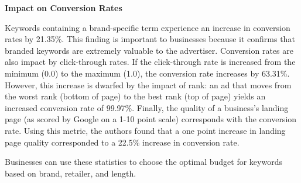 \documentclass[../summaries.tex]{subfiles}
\begin{document}
\textbf{Impact on Conversion Rates}

Keywords containing a brand-specific term experience an increase in conversion rates by 21.35\%. This finding is important to businesses because it confirms that branded keywords are extremely valuable to the advertiser. Conversion rates are also impact by click-through rates. If the click-through rate is increased from the minimum (0.0) to the maximum (1.0), the conversion rate increases by 63.31\%. However, this increase is dwarfed by the impact of rank:  an ad that moves from the worst rank (bottom of page) to the best rank (top of page) yields an increased conversion rate of 99.97\%. Finally, the quality of a business's landing page (as scored by Google on a 1-10 point scale) corresponds with the conversion rate. Using this metric, the authors found that a one point increase in landing page quality corresponded to a 22.5\% increase in conversion rate.

Businesses can use these statistics to choose the optimal budget for keywords based on brand, retailer, and length.
\end{document}
